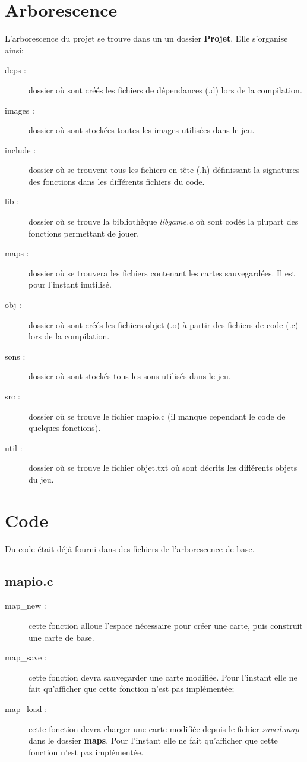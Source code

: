 \documentclass{report}
\begin{document}
\section{Arborescence}
L'arborescence du projet se trouve dans un un dossier \textbf{Projet}. Elle s'organise ainsi:
\begin{description}
\item[deps :] dossier où sont créés les fichiers de dépendances (.d) lors de la compilation.
\item[images :] dossier où sont stockées toutes les images utilisées dans le jeu.
\item[include :] dossier où se trouvent tous les fichiers en-tête (.h) définissant la signatures des fonctions dans les différents fichiers du code.
\item[lib :] dossier où se trouve la bibliothèque \textit{libgame.a} où sont codés la plupart des fonctions permettant de jouer.
\item[maps :] dossier où se trouvera les fichiers contenant les cartes sauvegardées. Il est pour l'instant inutilisé.
\item[obj :] dossier où sont créés les fichiers objet (.o) à partir des fichiers de code (.c) lors de la compilation.
\item[sons :] dossier où sont stockés tous les sons utilisés dans le jeu.
\item[src :] dossier où se trouve le fichier mapio.c (il manque cependant le code de quelques fonctions).
\item[util :] dossier où se trouve le fichier objet.txt où sont décrits les différents objets du jeu.
\end{description}

\section{Code}
Du code était déjà fourni dans des fichiers de l'arborescence de base.

\setcounter{subsection}{0}
\subsection{mapio.c}
\begin{description}
\item[map\_new :] cette fonction alloue l'espace nécessaire pour créer une carte, puis construit une carte de base.
\item[map\_save :] cette fonction devra sauvegarder une carte modifiée. Pour l'instant elle ne fait qu'afficher que cette fonction n'est pas implémentée;
\item[map\_load :] cette fonction devra charger une carte modifiée depuis le fichier \textit{saved.map} dans le dossier \textbf{maps}. Pour l'instant elle ne fait qu'afficher que cette fonction n'est pas implémentée.
\end{description}
\end{document}
